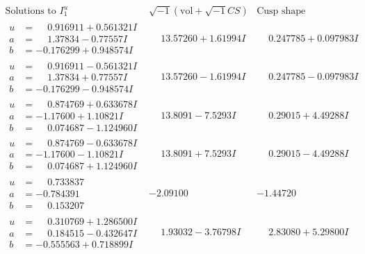 \documentclass[1p]{elsarticle_modified}
\theoremstyle{definition}
\newcommand{\I}{\sqrt{-1}}
\begin{document}
$$\begin{array}{c|c|c}  
\text{Solutions to }I^u_{1}& \I (\text{vol} + \sqrt{-1}CS) & \text{Cusp shape}\\
 \hline 
\begin{aligned}
u &= \phantom{-}0.916911 + 0.561321 I \\
a &= \phantom{-}1.37834 - 0.77557 I \\
b &= -0.176299 + 0.948574 I\end{aligned}
 & \phantom{-}13.57260 + 1.61994 I & \phantom{-}0.247785 + 0.097983 I \\ \hline\begin{aligned}
u &= \phantom{-}0.916911 - 0.561321 I \\
a &= \phantom{-}1.37834 + 0.77557 I \\
b &= -0.176299 - 0.948574 I\end{aligned}
 & \phantom{-}13.57260 - 1.61994 I & \phantom{-}0.247785 - 0.097983 I \\ \hline\begin{aligned}
u &= \phantom{-}0.874769 + 0.633678 I \\
a &= -1.17600 + 1.10821 I \\
b &= \phantom{-}0.074687 - 1.124960 I\end{aligned}
 & \phantom{-}13.8091 - 7.5293 I & \phantom{-}0.29015 + 4.49288 I \\ \hline\begin{aligned}
u &= \phantom{-}0.874769 - 0.633678 I \\
a &= -1.17600 - 1.10821 I \\
b &= \phantom{-}0.074687 + 1.124960 I\end{aligned}
 & \phantom{-}13.8091 + 7.5293 I & \phantom{-}0.29015 - 4.49288 I \\ \hline\begin{aligned}
u &= \phantom{-}0.733837\phantom{ +0.000000I} \\
a &= -0.784391\phantom{ +0.000000I} \\
b &= \phantom{-}0.153207\phantom{ +0.000000I}\end{aligned}
 & -2.09100\phantom{ +0.000000I} & -1.44720\phantom{ +0.000000I} \\ \hline\begin{aligned}
u &= \phantom{-}0.310769 + 1.286500 I \\
a &= \phantom{-}0.184515 - 0.432647 I \\
b &= -0.555563 + 0.718899 I\end{aligned}
 & \phantom{-}1.93032 - 3.76798 I & \phantom{-}2.83080 + 5.29800 I \\ \hline\begin{aligned}

\end{aligned}
\end{array}$$
\end{document}
